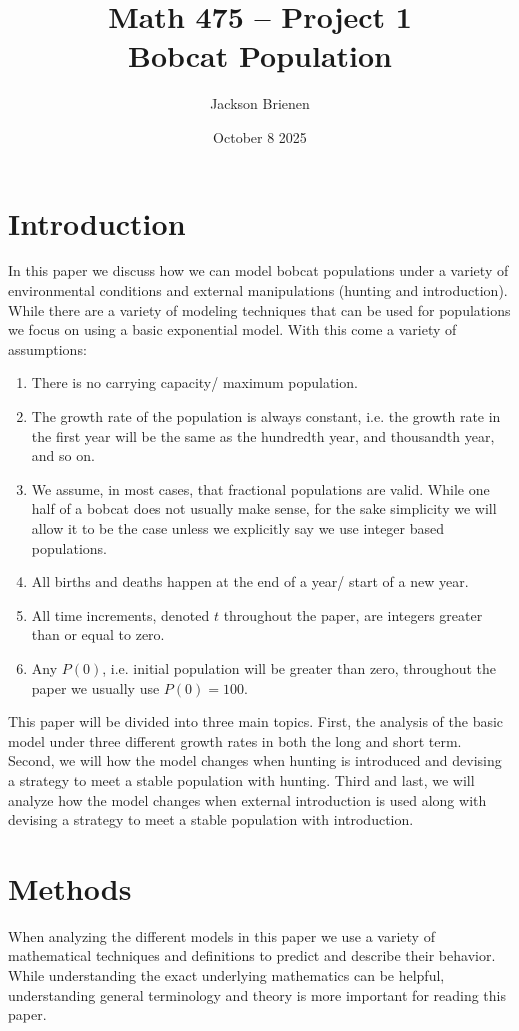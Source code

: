 \documentclass{article}
\title{Math 475 -- Project 1 \\ Bobcat Population}
\author{Jackson Brienen}
\date{October 8 2025}
\begin{document}
\maketitle

\section{Introduction}
In this paper we discuss how we can model bobcat populations under a variety of environmental conditions and external manipulations (hunting and introduction). While there are a variety of modeling techniques that can be used for populations we focus on using a basic exponential model. With this come a variety of assumptions:

\begin{enumerate}
    \item There is no carrying capacity/ maximum population.
    \item The growth rate of the population is always constant, i.e. the growth rate in the first year will be the same as the hundredth year, and thousandth year, and so on.
    \item We assume, in most cases, that fractional populations are valid. While one half of a bobcat does not usually make sense, for the sake simplicity we will allow it to be the case unless we explicitly say we use integer based populations.
    \item All births and deaths happen at the end of a year/ start of a new year.
    \item All time increments, denoted $t$ throughout the paper, are integers greater than or equal to zero.
    \item Any $P(0)$, i.e. initial population will be greater than zero, throughout the paper we usually use $P(0)=100$.
\end{enumerate}

This paper will be divided into three main topics. First, the analysis of the basic model under three different growth rates in both the long and short term. Second, we will how the model changes when hunting is introduced and devising a strategy to meet a stable population with hunting. Third and last, we will analyze how the model changes when external introduction is used along with devising a strategy to meet a stable population with introduction.

\section{Methods}
When analyzing the different models in this paper we use a variety of mathematical techniques and definitions to predict and describe their behavior. While understanding the exact underlying mathematics can be helpful, understanding general terminology and theory is more important for reading this paper.
\end{document}
